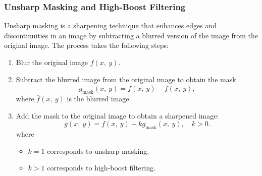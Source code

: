 \documentclass{article}
\begin{document}
\subsubsection{Unsharp Masking and High-Boost Filtering}
Unsharp masking is a sharpening technique that enhances edges and
discontinuities in an image by subtracting a blurred version of the
image from the original image. The process takes the following steps:
\begin{enumerate}
    \item Blur the original image \(f\left( x,\: y \right)\).
    \item Subtract the blurred image from the original image to obtain the mask
    \begin{equation*}
        g_{\text{mask}}\left( x,\: y \right) = f\left( x,\: y \right) - \bar{f}\left( x,\: y \right),
    \end{equation*}
    where \(\bar{f}\left( x,\: y \right)\) is the blurred image.
    \item Add the mask to the original image to obtain a sharpened image:
    \begin{equation*}
        g\left( x,\: y \right) = f\left( x,\: y \right) + k g_{\text{mask}}\left( x,\: y \right), \quad k > 0.
    \end{equation*}
    where
    \begin{itemize}
        \item \(k = 1\) corresponds to unsharp masking.
        \item \(k > 1\) corresponds to high-boost filtering.
    \end{itemize}
\end{enumerate}
\end{document}
